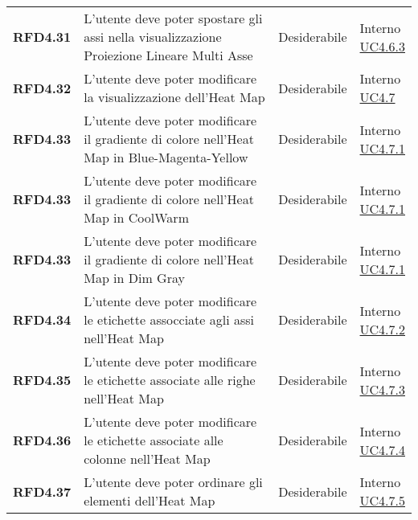 \begin{longtable}[H]{>{\raggedright\bfseries}m{20mm} >{\raggedright}m{90mm} >{\raggedright}m{28mm} >{\raggedright\arraybackslash}m{30mm}}
    RFD4.31
    & L'utente deve poter spostare gli assi nella visualizzazione Proiezione Lineare Multi Asse
    & Desiderabile
    & \makecell{ Interno \\  \hyperref[par:uc4.6.3]{UC4.6.3} }\\

    RFD4.32
    & L'utente deve poter modificare la visualizzazione dell'Heat Map
    & Desiderabile
    & \makecell{ Interno \\  \hyperref[ssub:uc4.7]{UC4.7} }\\

    RFD4.33
    & L'utente deve poter modificare il gradiente di colore nell'Heat Map in Blue-Magenta-Yellow
    & Desiderabile
    & \makecell{ Interno \\  \hyperref[par:uc4.7.1]{UC4.7.1} }\\

    RFD4.33
    & L'utente deve poter modificare il gradiente di colore nell'Heat Map in CoolWarm
    & Desiderabile
    & \makecell{ Interno \\  \hyperref[par:uc4.7.1]{UC4.7.1} }\\

    RFD4.33
    & L'utente deve poter modificare il gradiente di colore nell'Heat Map in Dim Gray
    & Desiderabile
    & \makecell{ Interno \\  \hyperref[par:uc4.7.1]{UC4.7.1} }\\

    RFD4.34
    & L'utente deve poter modificare le etichette assocciate agli assi nell'Heat Map
    & Desiderabile
    & \makecell{ Interno \\  \hyperref[par:uc4.7.2]{UC4.7.2} }\\

    RFD4.35
    & L'utente deve poter modificare le etichette associate alle righe nell'Heat Map
    & Desiderabile
    & \makecell{ Interno \\  \hyperref[par:uc4.7.3]{UC4.7.3} }\\

    RFD4.36
    & L'utente deve poter modificare le etichette associate alle colonne nell'Heat Map
    & Desiderabile
    & \makecell{ Interno \\  \hyperref[par:uc4.7.4]{UC4.7.4} }\\

    RFD4.37
    & L'utente deve poter ordinare gli elementi dell'Heat Map
    & Desiderabile
    & \makecell{ Interno \\  \hyperref[par:uc4.7.5]{UC4.7.5} }\\


\end{longtable}
